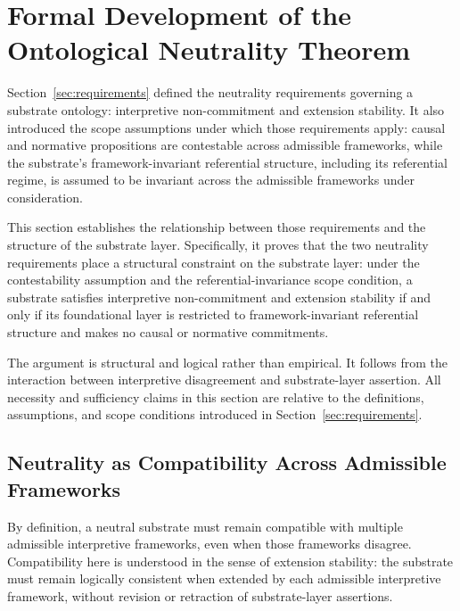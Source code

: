 
\section{Formal Development of the Ontological Neutrality Theorem}
\label{sec:formal-dev}

Section~\ref{sec:requirements} defined the neutrality
requirements governing a substrate ontology:
interpretive non-commitment and extension stability.
It also introduced the scope assumptions under which those requirements apply:
causal and normative propositions are contestable across admissible frameworks,
while the substrate's framework-invariant referential structure,
including its referential regime,
is assumed to be invariant
across the admissible frameworks under consideration.

This section establishes the relationship between those requirements
and the structure of the substrate layer.
Specifically, it proves that the two neutrality requirements
place a structural constraint on the substrate layer:
under the contestability assumption and
the referential-invariance scope condition,
a substrate satisfies interpretive non-commitment and extension stability
if and only if its foundational layer is
restricted to framework-invariant referential structure and
makes no causal or normative commitments.

The argument is structural and logical rather than empirical.
It follows from the interaction between interpretive disagreement
and substrate-layer assertion.
All necessity and sufficiency claims in this section
are relative to the definitions, assumptions, and scope conditions introduced in
Section~\ref{sec:requirements}.

\subsection{Neutrality as Compatibility Across Admissible Frameworks}
\label{subsec:compatibility}

By definition, a neutral substrate must remain compatible
with multiple admissible interpretive frameworks,
even when those frameworks disagree.
Compatibility here is understood in the sense of extension stability:
the substrate must remain logically consistent
when extended by each admissible interpretive framework,
without revision or retraction of substrate-layer assertions.

